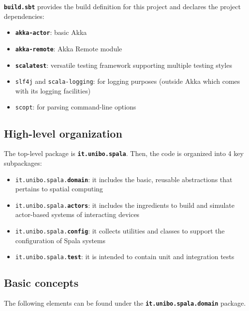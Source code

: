 \documentclass[11pt]{llncs}
\newcommand{\ttb}[1]{\textbf{\texttt{#1}}}
\begin{document}
\ttb{build.sbt} provides the build definition for this project and declares the project dependencies:

\begin{itemize}
\item \ttb{akka-actor}: basic Akka
\item \ttb{akka-remote}: Akka Remote module
\item \ttb{scalatest}: versatile testing framework supporting multiple testing styles
\item \texttt{slf4j} and \texttt{scala-logging}: for logging purposes (outside Akka which comes with its logging facilities)
\item \texttt{scopt}: for parsing command-line options
\end{itemize}

\subsection{High-level organization}

The top-level package is \ttb{it.unibo.spala}. Then, the code is organized into 4 key subpackages:

\begin{itemize}
\item \texttt{it.unibo.spala.\textbf{domain}}: it includes the basic, reusable abstractions that pertains to spatial computing
\item \texttt{it.unibo.spala.\textbf{actors}}: it includes the ingredients to build and simulate actor-based systems of interacting devices
\item \texttt{it.unibo.spala.\textbf{config}}: it collects utilities and classes to support the configuration of Spala systems
\item \texttt{it.unibo.spala.\textbf{test}}: it is intended to contain unit and integration tests
\end{itemize}


\subsection{Basic concepts}

The following elements can be found under the \ttb{it.unibo.spala.domain} package.
\end{document}
